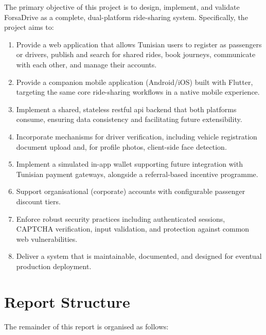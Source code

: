 \documentclass[12pt,a4paper,openright]{report}
\begin{document}
The primary objective of this project is to design, implement, and validate ForsaDrive as a complete, dual-platform ride-sharing system. Specifically, the project aims to:

\begin{enumerate}[noitemsep]
    \item Provide a web application that allows Tunisian users to register as passengers or drivers, publish and search for shared rides, book journeys, communicate with each other, and manage their accounts.
    \item Provide a companion mobile application (Android/iOS) built with Flutter, targeting the same core ride-sharing workflows in a native mobile experience.
    \item Implement a shared, stateless \gls{rest}ful \gls{api} backend that both platforms consume, ensuring data consistency and facilitating future extensibility.
    \item Incorporate mechanisms for driver verification, including vehicle registration document upload and, for profile photos, client-side face detection.
    \item Implement a simulated in-app wallet supporting future integration with Tunisian payment gateways, alongside a referral-based incentive programme.
    \item Support organisational (corporate) accounts with configurable passenger discount tiers.
    \item Enforce robust security practices including authenticated sessions, CAPTCHA verification, input validation, and protection against common web vulnerabilities.
    \item Deliver a system that is maintainable, documented, and designed for eventual production deployment.
\end{enumerate}

\section{Report Structure}

The remainder of this report is organised as follows:
\end{document}
